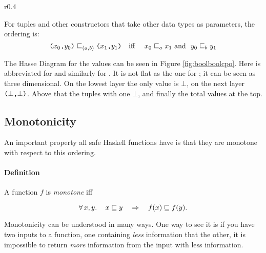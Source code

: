 \begin{wrapfigure}[25]{r}{0.4\textwidth} %
\begin{center}
\vspace{-30pt}

\caption{
    \texttt{(Bool,Bool)} order.
    \label{fig:boolboolcpo}
}
\end{center}
\end{wrapfigure} %
For tuples and other constructors that take other data types as
parameters, the ordering is:
\begin{equation*}
\texttt{(} x_0 \texttt{,} y_0 \texttt{)} \sqsubseteq_{(a,b)} \texttt{(} x_1 \texttt{,} y_1 \texttt{)} \text{\quad iff \quad}
x_0 \sqsubseteq_a x_1 \text{\,\,and \,\,} y_0 \sqsubseteq_b y_1
\end{equation*}

The Hasse Diagram for the  values can be seen in
Figure \ref{fig:boolboolcpo}. Here  is abbreviated for 
and similarly for . It is not flat as the one for ;
it can be seen as three dimensional. On the lowest layer the only
value is $\bot$, on the next layer $\texttt{(} \bot \texttt{,} \bot \texttt{)}$. Above that
the tuples with one $\bot$, and finally the total values at the
top.

\vspace{55pt}

\subsection{Monotonicity}
 An important property all safe Haskell functions have is that they are
monotone with respect to this ordering.

\paragraph{Definition} A function $f$ is \emph{monotone} iff

\begin{equation*}
\forall \, x , y . \, \quad x \sqsubseteq y \quad \Rightarrow \quad f(x) \sqsubseteq f(y).
\end{equation*}

Monotonicity can be understood in many ways. One way to see it is if you have
two inputs to a function, one containing \emph{less} information that
the other, it is impossible to return \emph{more} information from the
input with less information.

